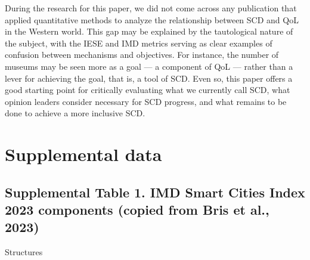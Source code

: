 \documentclass[
  english,
  12pt,
  a4paper,
]{scrartcl}
\begin{document}
During the research for this paper, we did not come across any
publication that applied quantitative methods to analyze the
relationship between SCD and QoL in the Western world. This gap may be
explained by the tautological nature of the subject, with the IESE and
IMD metrics serving as clear examples of confusion between mechanisms
and objectives. For instance, the number of museums may be seen more as
a goal --- a component of QoL --- rather than a lever for achieving the
goal, that is, a tool of SCD. Even so, this paper offers a good starting
point for critically evaluating what we currently call SCD, what opinion
leaders consider necessary for SCD progress, and what remains to be done
to achieve a more inclusive SCD.

\appendix

\section{Supplemental data}\label{supplemental-data}

\subsection{Supplemental Table 1. IMD Smart Cities Index 2023 components
(copied from Bris et al.,
2023)}\label{supplemental-table-1.-imd-smart-cities-index-2023-components-copied-from-bris-et-al.-2023}

Structures
\end{document}
